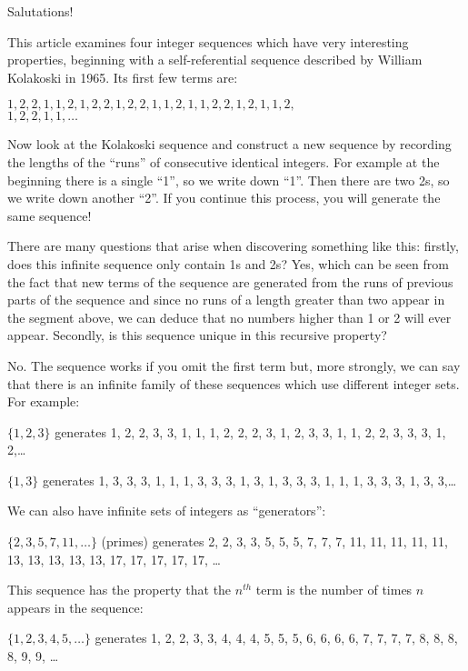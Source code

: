 \documentclass[11pt,a4paper]{report}
\begin{document}
	\begin{multicols}{2}
		
		Salutations!
		
		This article examines four integer sequences which have very interesting properties, beginning with a self-referential sequence described by William Kolakoski in 1965. Its first few terms are: \par
		\(1, 2, 2, 1, 1, 2, 1, 2, 2, 1, 2, 2, 1, 1, 2, 1, 1, 2, 2, 1, 2, 1, 1, 2,\)
		\\
		\(1, 2, 2, 1, 1,\ldots\) \par
		Now look at the Kolakoski sequence and construct a new sequence by recording the lengths of the “runs” of consecutive identical integers. For example at the beginning there is a single “1”, so we write down “1”. Then there are two 2s, so we write down another “2”. If you continue this process, you will generate the same sequence! \par
		There are many questions that arise when discovering something like this: firstly, does this infinite sequence only contain 1s and 2s? Yes, which can be seen from the fact that new terms of the sequence are generated from the runs of previous parts of the sequence and since no runs of a length greater than two appear in the segment above, we can deduce that no numbers higher than 1 or 2 will ever appear. Secondly, is this sequence unique in this recursive property? \par
		No. The sequence works if you omit the first term but, more strongly, we can say that there is an infinite family of these sequences which use different integer sets. For example:\par
		
		\(\{1, 2, 3\}\) generates 1, 2, 2, 3, 3, 1, 1, 1, 2, 2, 2, 3, 1, 2, 3, 3, 1, 1, 2, 2, 3, 3, 3, 1, 2,\ldots
		
		\(\{1, 3\}\) generates 1, 3, 3, 3, 1, 1, 1, 3, 3, 3, 1, 3, 1, 3, 3, 3, 1, 1, 1, 3, 3, 3, 1, 3, 3,\ldots
		
		We can also have infinite sets of integers as “generators”: \par
		
		\(\{2, 3, 5, 7, 11,\ldots\}\) (primes) generates 2, 2, 3, 3, 5, 5, 5, 7, 7, 7, 11, 11, 11, 11, 11, 13, 13, 13, 13, 13, 17, 17, 17, 17, 17, \ldots
		
		This sequence has the property that the \(n^{th}\) term is the number of times \(n\) appears in the sequence: \par
		\(\{1, 2, 3, 4, 5,\ldots\}\) generates 1, 2, 2, 3, 3, 4, 4, 4, 5, 5, 5, 6, 6, 6, 6, 7, 7, 7, 7, 8, 8, 8, 8, 9, 9, \ldots
		

\end{multicols}
\end{document}
